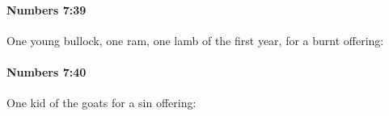 		\paragraph{Numbers 7:39} %
			\label{NUMBERS-7-39}

			One young bullock, one ram, one lamb of the first year, for a burnt offering:


		\paragraph{Numbers 7:40} %
			\label{NUMBERS-7-40}

			One kid of the goats for a sin offering:


